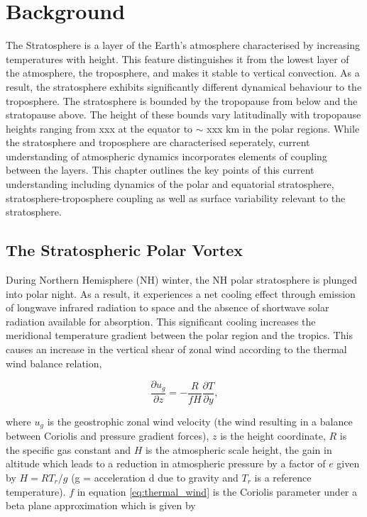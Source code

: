 \chapter{Background}
\label{cha:background}
The Stratosphere is a layer of the Earth's atmosphere characterised by increasing temperatures with height. This feature distinguishes it from the lowest layer of the atmosphere, the troposphere, and makes it stable to vertical convection. As a result, the stratosphere exhibits significantly different dynamical behaviour to the troposphere. The stratosphere is bounded by the tropopause from below and the stratopause above. The height of these bounds vary latitudinally with tropopause heights ranging from  xxx at the equator to $\sim$ xxx km in the polar regions. While the stratosphere and troposphere are characterised seperately, current understanding of atmospheric dynamics incorporates elements of coupling between the layers. This chapter outlines the key points of this current understanding including dynamics of the polar and equatorial stratosphere, stratosphere-troposphere coupling as well as surface variability relevant to the stratosphere.


\section{The Stratospheric Polar Vortex}
\label{sec:polar_vortex}
During Northern Hemisphere (NH) winter, the NH polar stratosphere is plunged into polar night. As a result, it experiences a net cooling effect through emission of longwave infrared radiation to space and the absence of shortwave solar radiation available for absorption. This significant cooling increases the meridional temperature gradient between the polar region and the tropics. This causes an increase in the vertical shear of zonal wind according to the thermal wind balance relation,

\begin{equation} \label{eq:thermal_wind}
\frac{\partial u_g}{\partial z} = -\frac{R}{f H}\frac{\partial T}{\partial y},
\end{equation}

where $u_g$ is the geostrophic zonal wind velocity (the wind resulting in a balance between Coriolis and pressure gradient forces), $z$ is the height coordinate, $R$ is the specific gas constant and $H$ is the atmospheric scale height, the gain in altitude which leads to a reduction in atmospheric pressure by a factor of $e$ given by $H = RT_r/g$ (g = acceleration d due to gravity and $T_r$ is a reference temperature). $f$ in equation \ref{eq:thermal_wind} is the Coriolis parameter under a beta plane approximation which is given by

